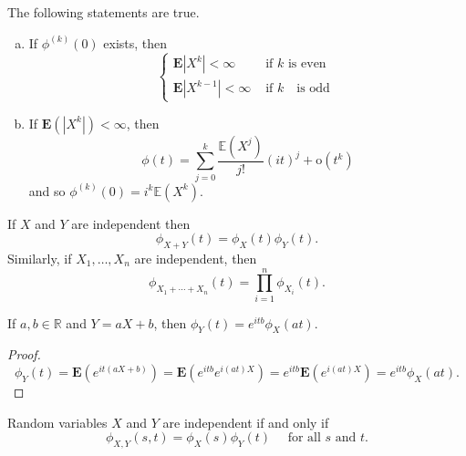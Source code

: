\begin{theorem}
The following statements are true.
\begin{enumerate}[(a)]
    \item If $\phi^{(k)}(0)$ exists, then 
    \begin{equation*}
        \left\{\begin{array}{ll}{\mathbf{E}\left|X^{k}\right|<\infty} & {\text { if $k$}  \text { is even }} \\ {\mathbf{E}\left|X^{k-1}\right|<\infty} & {\text { if $k$ } \text { is odd }}\end{array}\right.
    \end{equation*}
    
    \item If $\mathbf{E}(\left\vert X^k \right\vert) < \infty$, then 
    \begin{equation*}
        \phi(t)=\sum_{j=0}^{k} \frac{\mathbb{E}\left(X^{j}\right)}{j !}(i t)^{j}+\mathrm{o}\left(t^{k}\right)
    \end{equation*}
    and so $\phi^{(k)}(0)=i^{k} \mathbb{E}\left(X^{k}\right)$.
\end{enumerate}
\end{theorem}
\begin{theorem}
If $X$ and $Y$ are independent then 
\begin{equation*}
    \phi_{X+Y}(t)=\phi_{X}(t) \phi_{Y}(t).
\end{equation*}
Similarly, if $X_1, \dots, X_n$ are independent, then 
\begin{equation*}
    \phi_{X_1 + \cdots + X_n}(t)= \prod_{i=1}^n \phi_{X_i}(t).
\end{equation*}
\end{theorem}

\begin{theorem}
If $a, b \in \mathbb{R}$ and $Y = aX+b$, then $\phi_{Y}(t)=e^{i t b} \phi_{X}(a t)$.
\end{theorem}
\begin{proof}
\begin{equation*}
    \phi_{Y}(t)=\mathbf{E}\left(e^{i t(a X+b)}\right)=\mathbf{E}\left(e^{i t b} e^{i(a t) X}\right) = e^{i t b} \mathbf{E}\left(e^{i(a t) X}\right)=e^{i t b} \phi_{X}(a t).
\end{equation*}
\end{proof}

\begin{theorem}
Random variables $X$ and $Y$ are independent if and only if
\begin{equation*}
    \phi_{X, Y}(s, t)=\phi_{X}(s) \phi_{Y}(t) \quad \text { for all } s \text { and } t.
\end{equation*}
\end{theorem}

